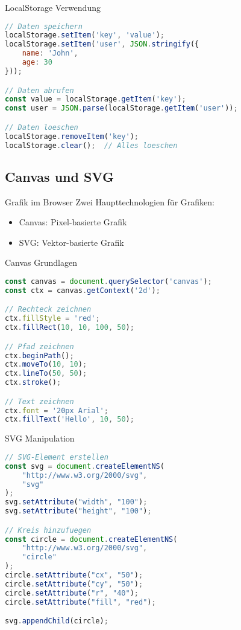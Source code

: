 \begin{KR}{LocalStorage Verwendung}
\begin{lstlisting}[language=JavaScript, style=basesmol]
// Daten speichern
localStorage.setItem('key', 'value');
localStorage.setItem('user', JSON.stringify({
    name: 'John',
    age: 30
}));

// Daten abrufen
const value = localStorage.getItem('key');
const user = JSON.parse(localStorage.getItem('user'));

// Daten loeschen
localStorage.removeItem('key');
localStorage.clear();  // Alles loeschen
\end{lstlisting}
\end{KR}

\subsection{Canvas und SVG}

\begin{concept}{Grafik im Browser}
    Zwei Haupttechnologien für Grafiken:
    \begin{itemize}
        \item Canvas: Pixel-basierte Grafik
        \item SVG: Vektor-basierte Grafik
    \end{itemize}
\end{concept}

\begin{KR}{Canvas Grundlagen}
\begin{lstlisting}[language=JavaScript, style=basesmol]
const canvas = document.querySelector('canvas');
const ctx = canvas.getContext('2d');

// Rechteck zeichnen
ctx.fillStyle = 'red';
ctx.fillRect(10, 10, 100, 50);

// Pfad zeichnen
ctx.beginPath();
ctx.moveTo(10, 10);
ctx.lineTo(50, 50);
ctx.stroke();

// Text zeichnen
ctx.font = '20px Arial';
ctx.fillText('Hello', 10, 50);
\end{lstlisting}
\end{KR}

\begin{KR}{SVG Manipulation}
\begin{lstlisting}[language=JavaScript, style=basesmol]
// SVG-Element erstellen
const svg = document.createElementNS(
    "http://www.w3.org/2000/svg", 
    "svg"
);
svg.setAttribute("width", "100");
svg.setAttribute("height", "100");

// Kreis hinzufuegen
const circle = document.createElementNS(
    "http://www.w3.org/2000/svg", 
    "circle"
);
circle.setAttribute("cx", "50");
circle.setAttribute("cy", "50");
circle.setAttribute("r", "40");
circle.setAttribute("fill", "red");

svg.appendChild(circle);
\end{lstlisting}
\end{KR}
